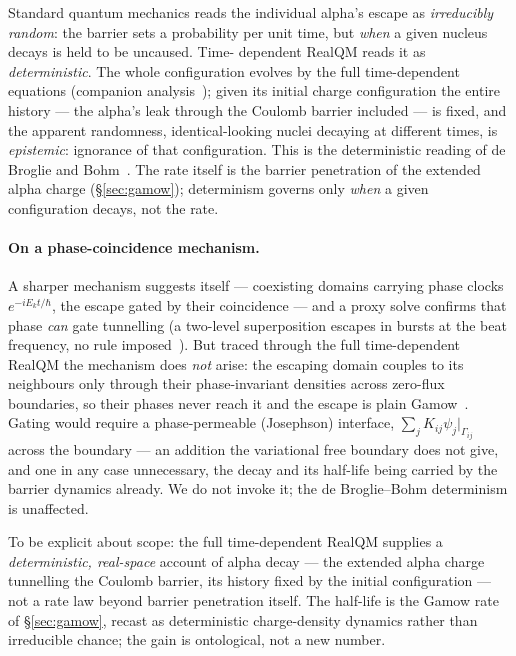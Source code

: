 \documentclass[11pt]{article}
\begin{document}
Standard quantum mechanics reads the individual alpha's escape as \emph{irreducibly random}: the barrier
sets a probability per unit time, but \emph{when} a given nucleus decays is held to be uncaused. Time-%
dependent RealQM reads it as \emph{deterministic}. The whole configuration evolves by the full time-dependent
equations (companion analysis~\cite{BetaCompanion}); given its initial charge configuration the entire
history --- the alpha's leak through the Coulomb barrier included --- is fixed, and the apparent randomness,
identical-looking nuclei decaying at different times, is \emph{epistemic}: ignorance of that configuration.
This is the deterministic reading of de Broglie and Bohm~\cite{deBroglie1927,Bohm1952}. The rate itself is
the barrier penetration of the extended alpha charge (\S\ref{sec:gamow}); determinism governs only
\emph{when} a given configuration decays, not the rate.

\paragraph{On a phase-coincidence mechanism.} A sharper mechanism suggests itself --- coexisting domains
carrying phase clocks $e^{-iE_kt/\hbar}$, the escape gated by their coincidence --- and a proxy solve
confirms that phase \emph{can} gate tunnelling (a two-level superposition escapes in bursts at the beat
frequency, no rule imposed~\cite{PhaseSim}). But traced through the full time-dependent RealQM the mechanism
does \emph{not} arise: the escaping domain couples to its neighbours only through their phase-invariant
densities across zero-flux boundaries, so their phases never reach it and the escape is plain
Gamow~\cite{BetaCompanion}. Gating would require a phase-permeable (Josephson) interface,
$\sum_jK_{ij}\psi_j|_{\Gamma_{ij}}$ across the boundary --- an addition the variational free boundary does
not give, and one in any case unnecessary, the decay and its half-life being carried by the barrier dynamics
already. We do not invoke it; the de Broglie--Bohm determinism is unaffected.

To be explicit about scope: the full time-dependent RealQM supplies a \emph{deterministic, real-space}
account of alpha decay --- the extended alpha charge tunnelling the Coulomb barrier, its history fixed by
the initial configuration --- not a rate law beyond barrier penetration itself. The half-life is the Gamow
rate of \S\ref{sec:gamow}, recast as deterministic charge-density dynamics rather than irreducible chance;
the gain is ontological, not a new number.
\end{document}
